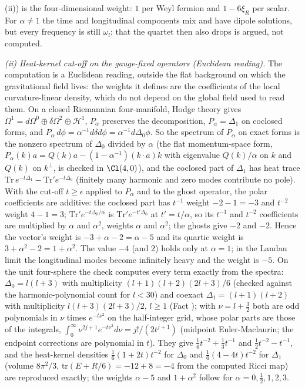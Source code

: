 (ii)) is the four-dimensional weight: $1$ per Weyl fermion and $1 - 6\xi_{R}$ per scalar. For $\alpha \neq 1$ the time and longitudinal components mix and have dipole solutions, but every frequency is still $\omega_{l}$; that the quartet then also drops is argued, not computed.

\emph{(ii) Heat-kernel cut-off on the gauge-fixed operators (Euclidean reading).} The computation is a Euclidean reading, outside the flat background on which the gravitational field lives: the weights it defines are the coefficients of the local curvature-linear density, which do not depend on the global field used to read them. On a closed Riemannian four-manifold, Hodge theory gives $\Omega^{1} = d\Omega^{0}\oplus\delta\Omega^{2}\oplus\mathcal{H}^{1}$, $P_{\alpha}$ preserves the decomposition, $P_{\alpha} = \Delta_{1}$ on coclosed forms, and $P_{\alpha}\,d\phi = \alpha^{-1}d\delta d\phi = \alpha^{-1}d\Delta_{0}\phi$. So the spectrum of $P_{\alpha}$ on exact forms is the nonzero spectrum of $\Delta_{0}$ divided by $\alpha$ (the flat momentum-space form, $P_{\alpha}(k)a = Q(k)a - (1 - \alpha^{-1})(k\cdot a)k$ with eigenvalue $Q(k)/\alpha$ on $k$ and $Q(k)$ on $k^{\perp}$, is checked in $\Cl(4,0)$), and the coclosed part of $\Delta_{1}$ has heat trace $\mathrm{Tr}\,e^{-t\Delta_{1}} - \mathrm{Tr}'e^{-t\Delta_{0}}$ (finitely many harmonic and zero modes contribute no pole). With the cut-off $t \ge \epsilon$ applied to $P_{\alpha}$ and to the ghost operator, the polar coefficients are additive: the coclosed part has $t^{-1}$ weight $-2 - 1 = -3$ and $t^{-2}$ weight $4 - 1 = 3$; $\mathrm{Tr}'e^{-t\Delta_{0}/\alpha}$ is $\mathrm{Tr}'e^{-t'\Delta_{0}}$ at $t' = t/\alpha$, so its $t^{-1}$ and $t^{-2}$ coefficients are multiplied by $\alpha$ and $\alpha^{2}$, weights $\alpha$ and $\alpha^{2}$; the ghosts give $-2$ and $-2$. Hence the vector's weight is $-3 + \alpha - 2 = \alpha - 5$ and its quartic weight is $3 + \alpha^{2} - 2 = 1 + \alpha^{2}$. The value $-4$ (and $2$) holds only at $\alpha = 1$; in the Landau limit the longitudinal modes become infinitely heavy and the weight is $-5$. On the unit four-sphere the check computes every term exactly from the spectra: $\Delta_{0} = l(l+3)$ with multiplicity $(l+1)(l+2)(2l+3)/6$ (checked against the harmonic-polynomial count for $l < 30$) and coexact $\Delta_{1} = (l+1)(l+2)$ with multiplicity $l(l+3)(2l+3)/2$, $l \ge 1$ (Fact ); with $\nu = l + \tfrac32$ both are odd polynomials in $\nu$ times $e^{-t\nu^{2}}$ on the half-integer grid, whose polar parts are those of the integrals, $\int_{0}^{\infty}\nu^{2j+1}e^{-t\nu^{2}}d\nu = j!/(2t^{j+1})$ (midpoint Euler-Maclaurin; the endpoint corrections are polynomial in $t$). They give $\tfrac16t^{-2} + \tfrac13t^{-1}$ and $\tfrac12t^{-2} - t^{-1}$, and the heat-kernel densities $\tfrac16(1 + 2t)t^{-2}$ for $\Delta_{0}$ and $\tfrac16(4 - 4t)t^{-2}$ for $\Delta_{1}$ (volume $8\pi^{2}/3$, $\mathrm{tr}(E + R/6) = -12 + 8 = -4$ from the computed Ricci map) are reproduced exactly; the weights $\alpha - 5$ and $1 + \alpha^{2}$ follow for $\alpha = 0, \tfrac12, 1, 2, 3$.

